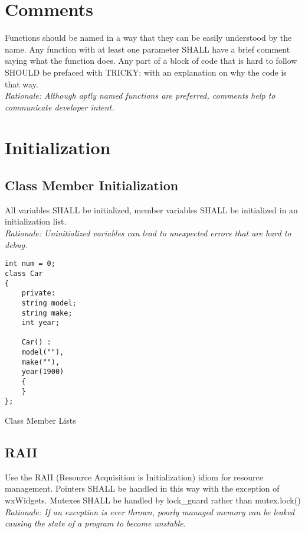 \documentclass{article}
\begin{document}
\section{Comments}
Functions should be named in a way that they can be easily understood by the name. Any function with at least one parameter SHALL have a brief comment saying what the function does. Any part of a block of code that is hard to follow SHOULD be prefaced with TRICKY: with an explanation on why the code is that way. \\
\textit{Rationale: Although aptly named functions are preferred, comments help to communicate developer intent.}

\newpage\section{Initialization}
\subsection{Class Member Initialization}
All variables SHALL be initialized, member variables SHALL be initialized in an initialization list. \\
\textit{Rationale: Uninitialized variables can lead to unexpected errors that are hard to debug.}

\begin{listing}[ht]
\begin{verbatim}
int num = 0;
class Car
{
    private:
    string model;
    string make;
    int year;
    
    Car() :
    model(""),
    make(""),
    year(1900)
    {
    }
};
\end{verbatim}
\caption{Class Member Lists}
\end{listing}

\newpage\noindent
\subsection{RAII}
Use the RAII (Resource Acquisition is Initialization) idiom for resource management. Pointers SHALL be handled in this way with the exception of wxWidgets. Mutexes SHALL be handled by lock\_guard rather than mutex.lock() \\
\textit{Rationale: If an exception is ever thrown, poorly managed memory can be leaked causing the state of a program to become unstable.} \\
\end{document}
